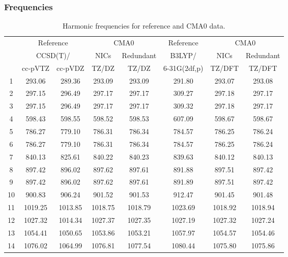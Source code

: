 \documentclass[10pt,oneside]{article}
\begin{document}
\begin{table}[h!]
\subsubsection*{Frequencies}
\centering
\caption{Harmonic frequencies for reference and CMA0 data.}
\begin{tabular}{cccccccc}
\toprule
{} & \multicolumn{2}{c}{Reference} & \multicolumn{2}{c}{CMA0} &    Reference & \multicolumn{2}{c}{CMA0} \\
{} & \multicolumn{2}{c}{CCSD(T)/} &    NICs &  Redundant &       B3LYP/ &    NICs & Redundant \\
{} &   cc-pVTZ & cc-pVDZ &   TZ/DZ &      TZ/DZ & 6-31G(2df,p) &  TZ/DFT &    TZ/DFT \\
\midrule
1  &    293.06 &  289.36 &  293.09 &     293.09 &       291.80 &  293.07 &    293.08 \\
2  &    297.15 &  296.49 &  297.17 &     297.17 &       309.27 &  297.18 &    297.17 \\
3  &    297.15 &  296.49 &  297.17 &     297.17 &       309.32 &  297.18 &    297.17 \\
4  &    598.43 &  598.55 &  598.52 &     598.53 &       607.09 &  598.67 &    598.67 \\
5  &    786.27 &  779.10 &  786.31 &     786.34 &       784.57 &  786.25 &    786.24 \\
6  &    786.27 &  779.10 &  786.31 &     786.34 &       784.57 &  786.25 &    786.24 \\
7  &    840.13 &  825.61 &  840.22 &     840.23 &       839.63 &  840.12 &    840.13 \\
8  &    897.42 &  896.02 &  897.62 &     897.61 &       891.88 &  897.51 &    897.42 \\
9  &    897.42 &  896.02 &  897.62 &     897.61 &       891.89 &  897.51 &    897.42 \\
10 &    900.83 &  906.24 &  901.52 &     901.53 &       912.47 &  901.45 &    901.48 \\
11 &   1019.25 & 1013.85 & 1018.75 &    1018.79 &      1023.69 & 1018.92 &   1018.94 \\
12 &   1027.32 & 1014.34 & 1027.37 &    1027.35 &      1027.19 & 1027.32 &   1027.24 \\
13 &   1054.41 & 1050.65 & 1053.86 &    1053.21 &      1057.97 & 1054.57 &   1054.46 \\
14 &   1076.02 & 1064.99 & 1076.81 &    1077.54 &      1080.44 & 1075.80 &   1075.86 \\

\end{tabular}
\end{table}
\end{document}
